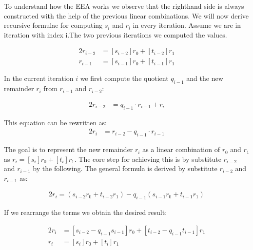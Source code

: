 \noindent
To understand how the EEA works we observe that the righthand side is always constructed with the help of the previous linear combinations. We will now derive recursive formulae for computing $s_i$ and $r_i$ in every iteration. Assume we are in iteration with index i.The two previous iterations we computed the values.

\noindent
\begin{alignat*}{2}
r_{i - 2} &= [s_{i-2}]r_0 +[t_{i-2}]r_1\\
r_{i-1} &= [s_{i-1}]r_0 +[t_{i-1}]r_1   
\end{alignat*}



\noindent
In the current iteration $i$ we first compute the quotient $q_{i-1}$ and the new remainder $r_i$ from $r_{i-1}$ and $r_{i-2}$:

\noindent
\begin{alignat*}{2}
r_{i-2} &= q_{i-1} \cdot r_{i-1}+r_i 
\end{alignat*}

\noindent
This equation can be rewritten as:\\

\noindent
\begin{alignat*}{2}
r_i &= r_{i-2}-q_{i-1} \cdot r_{i-1} 
\end{alignat*}


\noindent
The goal is to represent the new remainder $r_i$ as a linear combination of $r_0$ and $r_1$ as $r_i = [s_i]r_0 +[t_i]r_1$. The core step for achieving this is by substitute $r_{i-2}$ and $r_{i-1}$ by the following. The general formula is derived by substitute $r_{i-2}$ and $r_{i-1}$ as:


\noindent
\begin{alignat*}{2}
r_i = (s_{i-2}r_0+t_{i-2}r_1)-q_{i-1}(s_{i-1}r_0+t_{i-1}r_1) 
\end{alignat*}


\noindent
If we rearrange the terms we obtain the desired result:

\noindent
\begin{alignat*}{2}
r_i &= [s_{i-2}-q_{i-1}s_{i-1}]r_0 +[t_{i-2}-q_{i-1}t_{i-1}]r_1\\
r_i &= [s_i]r_0 +[t_i]r_1
\end{alignat*}